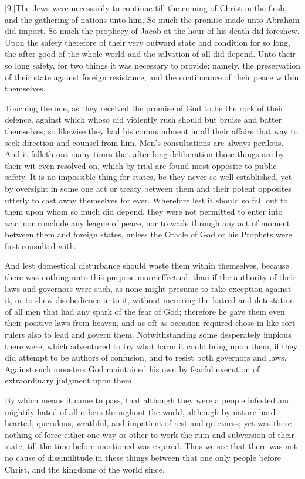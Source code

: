 [9.]The Jews were necessarily to continue till the coming of Christ in the flesh, and the gathering of nations unto him. So much the promise made unto Abraham did import. So much the prophecy of Jacob at the hour of his death did foreshew. Upon the safety therefore of their very outward state and condition for so long, the after-good of the whole world and the salvation of all did depend. Unto their so long safety, for two things it was necessary to provide; namely, the preservation of their state against foreign resistance, and the continuance of their peace within themselves.

Touching the one, as they received the promise of God to be the rock of their defence, against which whoso did violently rush should but bruise and batter themselves; so likewise they had his commandment in all their affairs that way to seek direction and counsel from him. Men’s consultations are always perilous. And it falleth out many times that after long deliberation those things are by their wit even resolved on, which by trial are found most opposite to public safety. It is no impossible thing for states, be they never so well established, yet by oversight in some one act or treaty between them and their potent opposites utterly to cast away themselves for ever. Wherefore lest it should so fall out to them upon whom so much did depend, they were not permitted to enter into war, nor conclude any league of peace, nor to wade through any act of moment between them and foreign states, unless the Oracle of God or his Prophets were first consulted with.

And lest domestical disturbance should waste them within themselves, because there was nothing unto this purpose more effectual, than if the authority of their laws and governors were such, as none might presume to take exception against it, or to shew disobedience unto it, without incurring the  hatred and detestation of all men that had any spark of the fear of God; therefore he gave them even their positive laws from heaven, and as oft as occasion required chose in like sort rulers also to lead and govern them. Notwithstanding some desperately impious there were, which adventured to try what harm it could bring upon them, if they did attempt to be authors of confusion, and to resist both governors and laws. Against such monsters God maintained his own by fearful execution of extraordinary judgment upon them.

By which means it came to pass, that although they were a people infested and mightily hated of all others throughout the world, although by nature hard-hearted, querulous, wrathful, and impatient of rest and quietness; yet was there nothing of force either one way or other to work the ruin and subversion of their state, till the time before-mentioned was expired. Thus we see that there was not no cause of dissimilitude in these things between that one only people before Christ, and the kingdoms of the world since.

